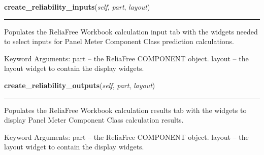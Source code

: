     \label{reliafree:meters:meter:Panel:create_reliability_inputs}

    \vspace{0.5ex}

\hspace{.8\funcindent}\begin{boxedminipage}{\funcwidth}

    \raggedright \textbf{create\_reliability\_inputs}(\textit{self}, \textit{part}, \textit{layout})

    \vspace{-1.5ex}

    \rule{\textwidth}{0.5\fboxrule}
\setlength{\parskip}{2ex}
    Populates the ReliaFree Workbook calculation input tab with the widgets
    needed to select inputs for Panel Meter Component Class prediction 
    calculations.

    Keyword Arguments: part   -- the ReliaFree COMPONENT object. layout -- 
    the layout widget to contain the display widgets.

\setlength{\parskip}{1ex}
    \end{boxedminipage}

    \label{reliafree:meters:meter:Panel:create_reliability_outputs}

    \vspace{0.5ex}

\hspace{.8\funcindent}\begin{boxedminipage}{\funcwidth}

    \raggedright \textbf{create\_reliability\_outputs}(\textit{self}, \textit{part}, \textit{layout})

    \vspace{-1.5ex}

    \rule{\textwidth}{0.5\fboxrule}
\setlength{\parskip}{2ex}
    Populates the ReliaFree Workbook calculation results tab with the 
    widgets to display Panel Meter Component Class calculation results.

    Keyword Arguments: part   -- the ReliaFree COMPONENT object. layout -- 
    the layout widget to contain the display widgets.

\setlength{\parskip}{1ex}
    \end{boxedminipage}

